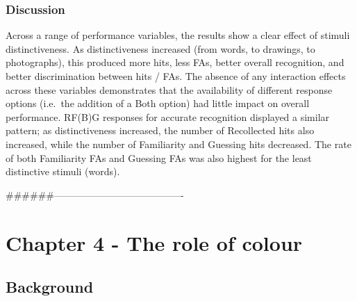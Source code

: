\documentclass[
  11pt,
]{article}
\begin{document}
\hypertarget{discussion-2}{%
\subsubsection{Discussion}\label{discussion-2}}

Across a range of performance variables, the results show a clear effect
of stimuli distinctiveness. As distinctiveness increased (from words, to
drawings, to photographs), this produced more hits, less FAs, better
overall recognition, and better discrimination between hits / FAs. The
absence of any interaction effects across these variables demonstrates
that the availability of different response options (i.e.~the addition
of a Both option) had little impact on overall performance. RF(B)G
responses for accurate recognition displayed a similar pattern; as
distinctiveness increased, the number of Recollected hits also
increased, while the number of Familiarity and Guessing hits decreased.
The rate of both Familiarity FAs and Guessing FAs was also highest for
the least distinctive stimuli (words).

\#\#\#\#\#\#----------------------------------------

\newpage

\hypertarget{chapter-4---the-role-of-colour}{%
\section{Chapter 4 - The role of
colour}\label{chapter-4---the-role-of-colour}}

\hypertarget{background-2}{%
\subsection{Background}\label{background-2}}
\end{document}
